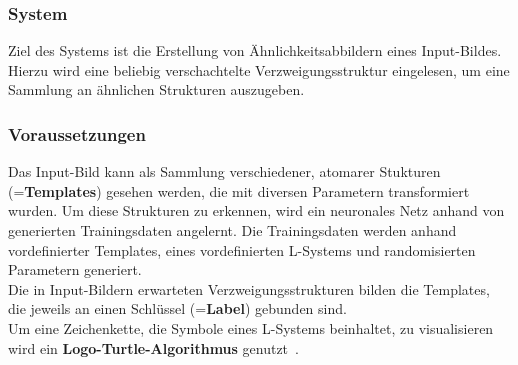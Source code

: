 \documentclass[11pt]{article}
\begin{document}
    \subsubsection{System}
    Ziel des Systems ist die Erstellung von Ähnlichkeitsabbildern eines Input-Bildes.
    Hierzu wird eine beliebig verschachtelte Verzweigungsstruktur eingelesen, um eine Sammlung an ähnlichen Strukturen
    auszugeben.

    \subsubsection{Voraussetzungen}
    Das Input-Bild kann als Sammlung verschiedener, atomarer Stukturen\\(=\textbf{Templates}) gesehen werden, die mit
    diversen Parametern transformiert wurden.
    Um diese Strukturen zu erkennen, wird ein neuronales Netz anhand von generierten Trainingsdaten angelernt.
    Die Trainingsdaten werden anhand vordefinierter Templates, eines vordefinierten L-Systems und randomisierten
    Parametern generiert.\\
    Die in Input-Bildern erwarteten Verzweigungsstrukturen bilden die Templates, die jeweils an einen Schlüssel
    (=\textbf{Label}) gebunden sind.\\
    Um eine Zeichenkette, die Symbole eines L-Systems beinhaltet, zu visualisieren wird ein \textbf{Logo-Turtle-Algorithmus}
    genutzt~\cite{3}.

    \newpage
\end{document}
